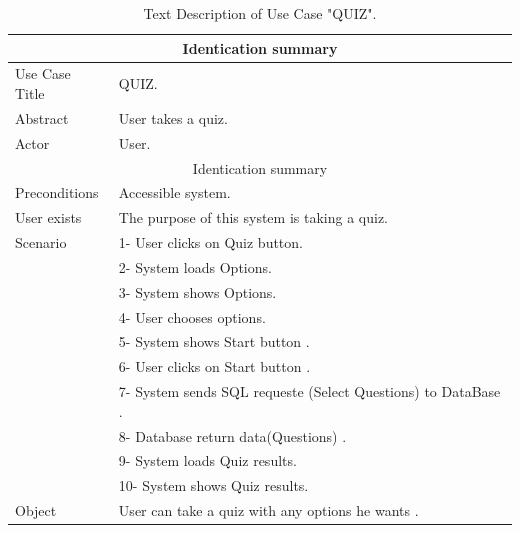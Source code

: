 \begin{table}[h!]
	\begin{center}
		\begin{tabular}{ |p{3cm}|p{9cm}|  }
			\hline
			\multicolumn{2}{|c|}{Identication summary} \\
			\hline
			Use Case Title & QUIZ. \\
			\hline
			Abstract   & User takes a quiz. \\
		   \hline
			Actor&  User. \\
		   \hline
		   \multicolumn{2}{|c|}{Identication summary} \\
		   \hline
		   Preconditions & Accessible system.  \\
		   \hline
		   User exists    &  The purpose of this system is taking a quiz. \\
		   \hline
		   Scenario &  1- User clicks on Quiz button. \\ & 2- System loads Options. \\ & 3- System shows Options. \\ & 4- User chooses options. \\ & 5- System shows Start button . \\ & 6- User clicks on Start button . \\ & 7- System sends SQL requeste (Select Questions) to DataBase . \\ & 8- Database return data(Questions) .\\ & 9- System loads Quiz results.\\ & 10- System shows Quiz results.\\
		   \hline
		   Object&  User can take a quiz with any options he wants .  \\
			\hline
\end{tabular}
\end{center}
\caption{Text Description of Use Case "QUIZ".}
\label{tab:DS QUIZ}
\end{table}



